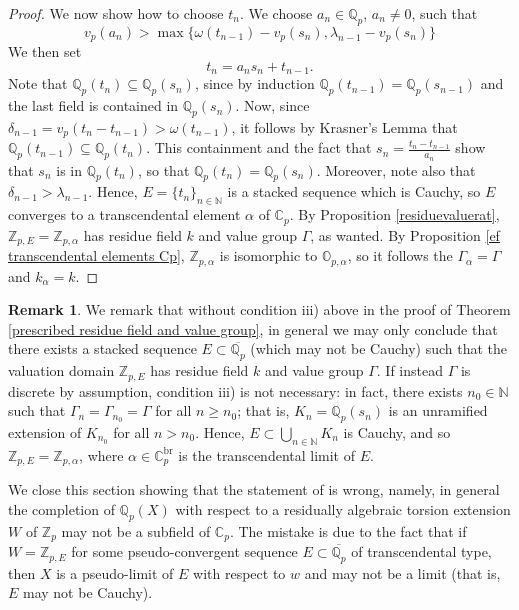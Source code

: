 \documentclass[10pt]{article}
\numberwithin{equation}{section}
\theoremstyle{definition}\newtheorem{Def}[equation]{Definition}
\newtheorem{Rem}[equation]{Remark}
\theoremstyle{definition}\newtheorem{Ques}[equation]{Question}
\newcommand{\Q}{\mathbb{Q}}
\newcommand{\N}{\mathbb{N}}
\newcommand{\Z}{\mathbb{Z}}
\renewcommand{\O}{\mathbb{O}}
\newcommand{\C}{\mathbb{C}}
\newcommand{\oQp}{\overline{\Q_p}}
\begin{document}
\begin{proof}
We now show how to choose $t_n$. We choose $a_n\in\Q_p$, $a_n\not=0$, such that
$$v_p(a_n)>\max\{\omega(t_{n-1})-v_p(s_n),\lambda_{n-1}-v_p(s_n)\}$$ We then set
$$t_n=a_ns_n+t_{n-1}.$$
Note that $\Q_p(t_n)\subseteq\Q_p(s_n)$, since by induction $\Q_p(t_{n-1})=\Q_p(s_{n-1})$ and the last field is contained in $\Q_p(s_n)$. Now, since $\delta_{n-1}=v_p(t_n-t_{n-1})>\omega(t_{n-1})$, it follows by Krasner's Lemma that $\Q_p(t_{n-1})\subseteq\Q_p(t_n)$. This containment and the fact that $s_n=\frac{t_n-t_{n-1}}{a_n}$ show that $s_n$ is in $\Q_p(t_n)$, so that $\Q_p(t_n)=\Q_p(s_n)$. Moreover, note also that $\delta_{n-1}>\lambda_{n-1}$. Hence, $E=\{t_n\}_{n\in\N}$ is a stacked sequence which is Cauchy, so $E$ converges to a transcendental element $\alpha$ of  $\C_p$. By Proposition \ref{residuevaluerat}, $\Z_{p,E}=\Z_{p,\alpha}$ has residue field $k$ and value group $\Gamma$, as wanted. By  Proposition \ref{ef transcendental elements Cp}, $\Z_{p,\alpha}$ is isomorphic to $\O_{p,\alpha}$, so it follows the $\Gamma_{\alpha}=\Gamma$ and $k_{\alpha}=k$.
\end{proof}
\begin{Rem}\label{discrete Gamma}
We remark that without condition iii) above in the proof of Theorem \ref{prescribed residue field and value group}, in general we may only conclude that there exists a stacked sequence $E\subset\oQp$ (which may not be Cauchy) such that the valuation domain $\Z_{p,E}$ has residue field $k$ and value group $\Gamma$. If instead $\Gamma$ is discrete by assumption, condition iii) is not necessary: in fact, there exists $n_0\in\N$ such that $\Gamma_n=\Gamma_{n_0}=\Gamma$ for all $n\geq n_0$; that is, $K_n=\Q_p(s_n)$ is an unramified extension of $K_{n_0}$ for all $n>n_0$. Hence, $E\subset \bigcup_{n\in\N}K_n$ is Cauchy, and so $\Z_{p,E}=\Z_{p,\alpha}$, where $\alpha\in\C_p^{\text{br}}$ is the transcendental limit of $E$. 
\end{Rem}

We close this section showing that the statement of \cite[Proposition 1]{IovZah} is wrong, namely, in general the completion of $\Q_p(X)$ with respect to a residually algebraic torsion extension $W$ of $\Z_p$ may not be a subfield of $\C_p$. The mistake is due to the fact that if $W=\Z_{p,E}$ for some pseudo-convergent sequence $E\subset\oQp$ of transcendental type, then $X$ is a pseudo-limit of $E$ with respect to $w$ and may not be a limit (that is, $E$ may not be Cauchy).
\end{document}
